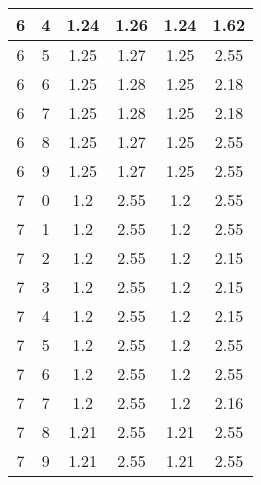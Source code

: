 \begin{longtable}{|c|c||c||c||c|c|}
	6 & 4 & 1.24 & 1.26 & 1.24 & 1.62 \\ \hline
	6 & 5 & 1.25 & 1.27 & 1.25 & 2.55 \\ \hline
	6 & 6 & 1.25 & 1.28 & 1.25 & 2.18 \\ \hline
	6 & 7 & 1.25 & 1.28 & 1.25 & 2.18 \\ \hline
	6 & 8 & 1.25 & 1.27 & 1.25 & 2.55 \\ \hline
	6 & 9 & 1.25 & 1.27 & 1.25 & 2.55 \\ \hline
	7 & 0 & 1.2 & 2.55 & 1.2 & 2.55 \\ \hline
	7 & 1 & 1.2 & 2.55 & 1.2 & 2.55 \\ \hline
	7 & 2 & 1.2 & 2.55 & 1.2 & 2.15 \\ \hline
	7 & 3 & 1.2 & 2.55 & 1.2 & 2.15 \\ \hline
	7 & 4 & 1.2 & 2.55 & 1.2 & 2.15 \\ \hline
	7 & 5 & 1.2 & 2.55 & 1.2 & 2.55 \\ \hline
	7 & 6 & 1.2 & 2.55 & 1.2 & 2.55 \\ \hline
	7 & 7 & 1.2 & 2.55 & 1.2 & 2.16 \\ \hline
	7 & 8 & 1.21 & 2.55 & 1.21 & 2.55 \\ \hline
	7 & 9 & 1.21 & 2.55 & 1.21 & 2.55 \\ \hline
\end{longtable}

